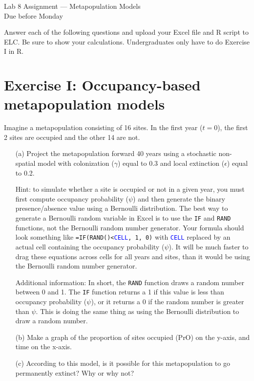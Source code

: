 \documentclass[12pt]{article}\usepackage[]{graphicx}\usepackage[]{xcolor}
\begin{document}
{
  \Large
  \centering
  Lab 8 Assignment --- Metapopulation Models \\
  Due before Monday \\
}

\vspace{6pt}

Answer each of the following questions and upload your Excel file and
R script to ELC. Be sure to show your calculations. Undergraduates
only have to do Exercise I in R. \\

\vspace{6pt}

\section*{Exercise I: Occupancy-based metapopulation models}


Imagine a metapopulation consisting of 16 sites. In the first year
($t=0$), the first 2 sites are occupied and the other 14 are not.
\begin{enumerate}
  \item[(a)] Project the metapopulation forward 40 years using a
    stochastic non-spatial model with colonization ($\gamma$) equal to
    0.3 and local extinction ($\epsilon$) equal to 0.2.

    Hint: to simulate whether a site is occupied or not in a given year,
    you must first compute occupancy probability ($\psi$) and then generate
    the binary presence/absence value using a Bernoulli distribution. The
    best way to generate a Bernoulli random variable in Excel is to use
    the \texttt{IF} and \texttt{RAND} functions, not the Bernoulli
    random number generator. Your formula should look something like
    \texttt{=IF(RAND()<\textcolor{blue}{CELL}, 1, 0)} with
    \texttt{\textcolor{blue}{CELL}} replaced by an  
    actual cell containing the occupancy probability
    ($\psi$). It will be much faster to drag these equations across
    cells for all years and sites, than it would be using the
    Bernoulli random number generator.

    Additional information: In short, the \texttt{RAND} function draws a
    random number between 0 and 1. The \texttt{IF} function returns a 1 if
    this value is less than occupancy probability ($\psi$), or it returns
    a 0 if the random number is greater than $\psi$. This is doing the
    same thing as using the Bernoulli distribution to draw a random
    number.
  \item[(b)] Make a graph of the proportion of sites occupied (PrO)
    on the y-axis, and time on the x-axis.
  \item[(c)] According to this model, is it possible for this
    metapopulation to go permanently extinct? Why or why not?
\end{enumerate}
\end{document}
